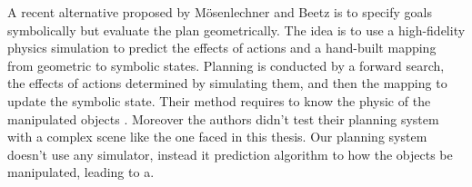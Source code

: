 

A recent alternative proposed by Mösenlechner and Beetz \citep{Msenlechner2009UsingPA} is to specify goals symbolically but evaluate the plan geometrically.
The idea is to use a high-fidelity physics simulation to predict the effects of actions and a hand-built mapping from geometric to symbolic states. Planning is conducted by a forward search,  the effects of actions  determined by simulating them, and then  the mapping  to update the symbolic state.  Their method  requires to know the physic of the manipulated objects . Moreover the authors didn't test their planning system with a complex scene like the one faced in this thesis.
Our planning system doesn't use any simulator, instead it  prediction algorithm to  how the objects  be manipulated, leading to a. 




